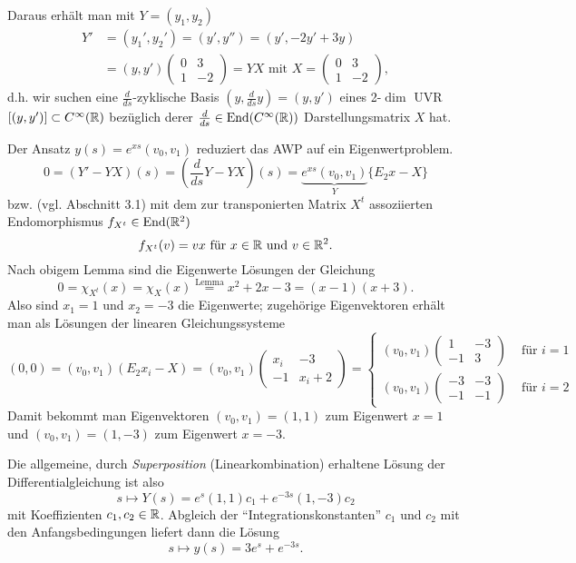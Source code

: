 	Daraus erhält man mit $ Y= (y_1,y_2) $
	  \begin{align*}
		 Y' &= (y_1',y_2') = (y',y'') = (y',-2y'+3y)\\
		 &= (y,y') \begin{pmatrix}
		 	0 & 3\\ 1 & -2
		 \end{pmatrix} = YX	\text{ mit }
		 X= \begin{pmatrix}
			0 & 3\\ 1 & -2
		\end{pmatrix},
		\end{align*}
	d.h. wir suchen eine $ \frac{d}{ds} $-zyklische Basis $ (y,\frac{d}{ds}y) = (y,y') $ eines 2-$ \dim $ UVR $ [(y,y')]\subset C^\infty(\mathbb{R}) $ bezüglich derer $ \frac{d}{ds}\in \operatorname{End}(C^\infty(\mathbb{R})) $ Darstellungsmatrix $ X $ hat.
	
	Der Ansatz $ y(s) = e^{xs} (v_0,v_1)$ reduziert das AWP auf ein Eigenwertproblem.
		\[ 0 = \left(Y'-YX\right)(s) = \left(\frac{d}{ds}Y - YX\right)(s) = \underset{Y}{\underbrace{e^{xs}(v_0,v_1)}} \{E_2x-X\}\]
	bzw. (vgl. Abschnitt 3.1) mit dem zur transponierten Matrix $ X^t $ assoziierten Endomorphismus $ f_{X^t}\in \operatorname{End}(\mathbb{R}^2) $
		\[ f_{X^t}(v) = vx \text{ für }x\in\mathbb{R} \text{ und }v\in \mathbb{R}^2. \]
	Nach obigem Lemma sind die Eigenwerte Lösungen der Gleichung
		\[ 0 = \chi_{X^t}(x) = \chi_X(x) \overset{\text{Lemma}}{=} x^2+2x-3 = (x-1)(x+3). \]
	Also sind $ x_1 = 1 $ und $ x_2 = -3 $ die Eigenwerte; zugehörige Eigenvektoren erhält man als Lösungen der linearen Gleichungssysteme
		\[ (0,0) = (v_0,v_1)(E_2x_i-X)= (v_0,v_1)\begin{pmatrix}
		x_i&-3\\-1&x_i+2
		\end{pmatrix} = \begin{cases}
		(v_0,v_1)\begin{pmatrix}
		1&-3\\-1&3
		\end{pmatrix}& \text{ für } i = 1\\
		(v_0,v_1)\begin{pmatrix}
		-3&-3\\-1&-1
		\end{pmatrix}& \text{ für } i = 2
		\end{cases} \]
	Damit bekommt man Eigenvektoren $ (v_0,v_1) = (1,1) $ zum Eigenwert $ x=1 $ und $ (v_0,v_1) = (1,-3) $ zum Eigenwert $ x = -3 $.
	
	Die allgemeine, durch \emph{Superposition} (Linearkombination) erhaltene Lösung der Differentialgleichung ist also
		\[ s\mapsto Y(s) = e^s(1,1)c_1 + e^{-3s}(1,-3)c_2 \]
	mit Koeffizienten $ c_1,c_2 \in \mathbb{R} $. Abgleich der "`Integrationskonstanten"' $ c_1 $ und $ c_2 $ mit den Anfangsbedingungen liefert dann die Lösung
		\[ s \mapsto y(s) = 3e^s+e^{-3s}. \]
